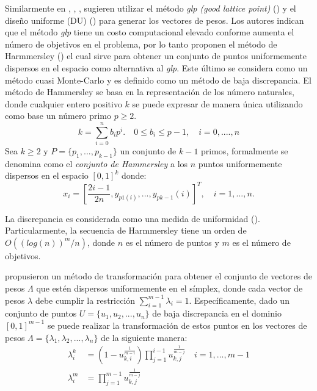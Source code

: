 Similarmente en \cite{tan2012modification}, \cite{tan2013moea}, \cite{ma2014moea}, \cite{berengueroptimizacion} sugieren utilizar el método \textit{glp (good lattice point)} (\cite{fang1994number}) y el diseño uniforme (DU) (\cite{fang1980uniform}) para generar los vectores de pesos.
%
Los autores \citeauthor{berengueroptimizacion} indican que el método \textit{glp} tiene un costo computacional elevado conforme aumenta el número de objetivos en el problema, por lo tanto proponen el método de Harmmersley (\cite{talke2012number}) el cual sirve para obtener un conjunto de puntos uniformemente dispersos en el espacio como alternativa al \textit{glp}.
%
Este último se considera como un método cuasi Monte-Carlo y es definido como un método de baja discrepancia.
%
El método de Hammersley se basa en la representación de los número naturales, donde cualquier entero positivo $k$ se puede expresar de manera única utilizando como base un número primo $p \geq 2$.
\begin{equation}
k = \sum_{i=0}^n b_i  p^i. \quad 0 \leq b_i \leq p-1, \quad i=0,....,n
\end{equation}
%
Sea $k \geq 2$ y $P = \{ p_1, ..., p_{k-1} \}$ un conjunto de $k-1$ primos, formalmente se denomina como el \textit{conjunto de Hammersley} a los $n$ puntos uniformemente dispersos en el espacio $[0, 1]^k$ donde:
%
\begin{equation}
   x_i = \left [ \frac{2i-1}{2n}, y_{p1(i)}, ..., y_{pk-1}(i)  \right ]^T, \quad i=1, ..., n.
\end{equation}
%

%
La discrepancia es considerada como una medida de uniformidad (\cite{talke2012number}).
%
Particularmente, la secuencia de Harmmersley tiene un orden de $O((log (n) )^m / n)$, donde $n$ es el número de puntos y $m$ es el número de objetivos.


\citeauthor{yuan11number} propusieron un método de transformación para obtener el conjunto de vectores de pesos $\Lambda$ que estén dispersos uniformemente en el símplex, donde cada vector de pesos $\lambda$ debe cumplir la restricción $\sum_{i=1}^{m-1} \lambda_i = 1$.
%
Específicamente, dado un conjunto de puntos $U = \{u_1, u_2, ..., u_n \}$ de baja discrepancia en el dominio $[0, 1]^{m-1}$ se puede realizar la transformación de estos puntos en los vectores de pesos  $\Lambda = \{ \lambda_1, \lambda_2, ..., \lambda_n \}$ de la siguiente manera:
%
\begin{equation}\label{Transformacion_Uniformes}
\begin{split}
\lambda_{i}^k &= ( 1 -  u_{k,i}^{\frac{1}{m-i}} ) \prod_{j=1}^{i-1} u_{k,j}^{\frac{1}{m-j}} \quad i=1,..., m-1\\
\lambda_{i}^m &= \prod_{j=1}^{m-1} u_{k,j}^{\frac{1}{m-j}}
\end{split}
\end{equation}

